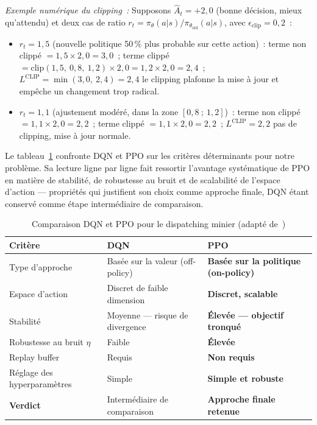 \documentclass[11pt,a4paper]{report}
\begin{document}
\textit{Exemple numérique du clipping~:} Supposons $\hat{A}_t = +2{,}0$ (bonne décision, mieux qu'attendu) et deux cas de ratio $r_t = \pi_\theta(a|s)/\pi_{\theta_\text{old}}(a|s)$, avec $\epsilon_\text{clip} = 0{,}2$~:
\begin{itemize}
    \item $r_t = 1{,}5$ (nouvelle politique 50\,\% plus probable sur cette action)~: terme non clippé $= 1{,}5 \times 2{,}0 = 3{,}0$~; terme clippé $= \text{clip}(1{,}5,\ 0{,}8,\ 1{,}2) \times 2{,}0 = 1{,}2 \times 2{,}0 = 2{,}4$~; $L^{\text{CLIP}} = \min(3{,}0,\ 2{,}4) = 2{,}4$ \textrightarrow{} le clipping plafonne la mise à jour et empêche un changement trop radical.
    \item $r_t = 1{,}1$ (ajustement modéré, dans la zone $[0{,}8~;~1{,}2]$)~: terme non clippé $= 1{,}1 \times 2{,}0 = 2{,}2$~; terme clippé $= 1{,}1 \times 2{,}0 = 2{,}2$~; $L^{\text{CLIP}} = 2{,}2$ \textrightarrow{} pas de clipping, mise à jour normale.
\end{itemize}

Le tableau~\ref{tab:comparaison-algos} confronte DQN et PPO sur les crit\`eres d\'eterminants pour notre probl\`eme. Sa lecture ligne par ligne fait ressortir l'avantage syst\'ematique de PPO en mati\`ere de stabilit\'e, de robustesse au bruit et de scalabilit\'e de l'espace d'action --- propri\'et\'es qui justifient son choix comme approche finale, DQN \'etant conserv\'e comme \'etape interm\'ediaire de comparaison.

\begin{table}[H]
\centering
\caption{Comparaison DQN et PPO pour le dispatching minier 
(adapté de~\cite{MoezKrichen2022})}
\label{tab:comparaison-algos}
\begin{tabularx}{\textwidth}{lXX}
\toprule
\textbf{Critère} & \textbf{DQN} & \textbf{PPO} \\
\midrule
Type d'approche & Basée sur la valeur (off-policy) & \textbf{Basée sur la politique (on-policy)} \\
Espace d'action & Discret de faible dimension & \textbf{Discret, scalable} \\
Stabilité & Moyenne — risque de divergence & \textbf{Élevée — objectif tronqué} \\
Robustesse au bruit $\eta$ & Faible & \textbf{Élevée} \\
Replay buffer & Requis & \textbf{Non requis} \\
Réglage des hyperparamètres & Simple & \textbf{Simple et robuste} \\
\midrule
\textbf{Verdict} & Intermédiaire de comparaison & \textbf{Approche finale retenue} \\
\bottomrule
\end{tabularx}
\end{table}
\end{document}
